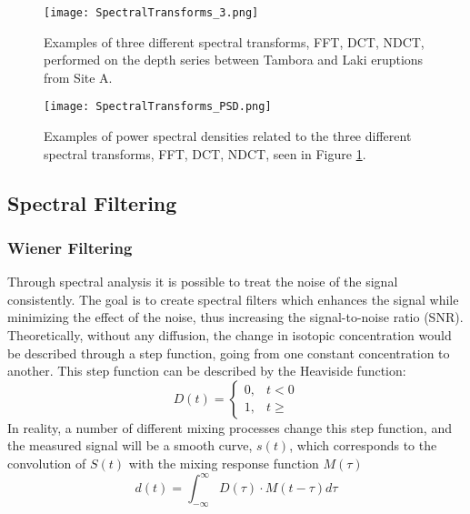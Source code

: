 \documentclass[../../CompleteThesis2/Complete_2ndDraft]{subfiles}
\begin{document}
\begin{figure}[h]
	\centering
	\texttt{[image: SpectralTransforms\_3.png]}
	\caption[FFT, DCT, NDCT, Site A]{Examples of three different spectral transforms, FFT, DCT, NDCT, performed on the depth series between Tambora and Laki eruptions from Site A.}
	\label{fig:SpectralTransforms_3}
\end{figure}

\begin{figure}[h]
	\centering
	\texttt{[image: SpectralTransforms\_PSD.png]}
	\caption[FFT, DCT, NDCT PSDs, Site A]{Examples of power spectral densities related to the three different spectral transforms, FFT, DCT, NDCT, seen in Figure \ref{fig:SpectralTransforms_3}.}
	\label{fig:SpectralTransforms_PSD}
\end{figure}



\subsection[Spectral Filtering][Spectral Filtering]{Spectral Filtering}
\label{Subsec:SignalAnalysis_BackDiffusion_SpectralFiltering}
\subsubsection[Wiener Filtering][Wiener Filtering]{Wiener Filtering}
\label{Subsubsec:SignalAnalysis_BackDiffusion_SpectralFiltering_Wiener}
Through spectral analysis it is possible to treat the noise of the signal consistently. The goal is to create spectral filters which enhances the signal while minimizing the effect of the noise, thus increasing the signal-to-noise ratio (SNR).\\
Theoretically, without any diffusion, the change in isotopic concentration would be described through a step function, going from one constant concentration to another. This step function can be described by the Heaviside function:
\begin{equation}
	D(t) = \begin{cases}
		0, & t < 0 \\
		1, & t \geq
	\end{cases}
\end{equation}
In reality, a number of different mixing processes change this step function, and the measured signal will be a smooth curve, $s(t)$, which corresponds to the convolution of $S(t)$ with the mixing response function $M(\tau)$
\begin{equation}
	d(t) = \int_{- \infty}^{\infty} D(\tau) \cdot M(t - \tau)d\tau
\end{equation}
\end{document}
